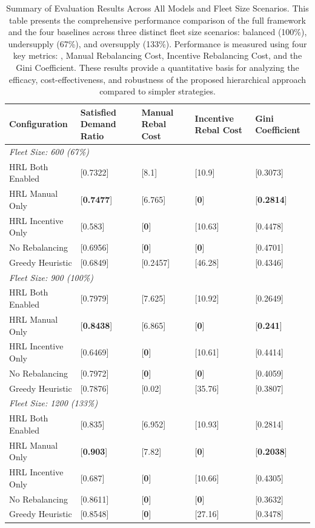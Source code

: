 \begin{table}
    \centering
    \begin{tabularx}{\textwidth}{lXXXX}
    \toprule
    \textbf{Configuration} & \textbf{Satisfied Demand Ratio} & \textbf{Manual Rebal Cost} & \textbf{Incentive Rebal Cost} & \textbf{Gini Coefficient} \\
    \midrule
    \multicolumn{5}{l}{\textit{Fleet Size: 600 (67\%)}} \\
    HRL Both Enabled & [0.7322] & [8.1] & [10.9] & [0.3073] \\
    HRL Manual Only & [\textbf{0.7477}] & [6.765] & [\textbf{0}] & [\textbf{0.2814}] \\
    HRL Incentive Only & [0.583] & [\textbf{0}] & [10.63] & [0.4478] \\
    No Rebalancing & [0.6956] & [\textbf{0}] & [\textbf{0}] & [0.4701] \\
    Greedy Heuristic & [0.6849] & [0.2457] & [46.28] & [0.4346] \\
    \midrule
    \multicolumn{5}{l}{\textit{Fleet Size: 900 (100\%)}} \\
    HRL Both Enabled & [0.7979] & [7.625] & [10.92] & [0.2649] \\
    HRL Manual Only & [\textbf{0.8438}] & [6.865] & [\textbf{0}] & [\textbf{0.241}] \\
    HRL Incentive Only & [0.6469] & [\textbf{0}] & [10.61] & [0.4414] \\
    No Rebalancing & [0.7972] & [\textbf{0}] & [\textbf{0}] & [0.4059] \\
    Greedy Heuristic & [0.7876] & [0.02] & [35.76] & [0.3807] \\
    \midrule
    \multicolumn{5}{l}{\textit{Fleet Size: 1200 (133\%)}} \\
    HRL Both Enabled & [0.835] & [6.952] & [10.93] & [0.2814] \\
    HRL Manual Only & [\textbf{0.903}] & [7.82] & [\textbf{0}] & [\textbf{0.2038}] \\
    HRL Incentive Only & [0.687] & [\textbf{0}] & [10.66] & [0.4305] \\
    No Rebalancing & [0.8611] & [\textbf{0}] & [\textbf{0}] & [0.3632] \\
    Greedy Heuristic & [0.8548] & [\textbf{0}] & [27.16] & [0.3478] \\
    \bottomrule
    \end{tabularx}
    \caption{Summary of Evaluation Results Across All Models and Fleet Size Scenarios. This table presents the comprehensive performance comparison of the full  framework and the four baselines across three distinct fleet size scenarios: balanced (100\%), undersupply (67\%), and oversupply (133\%). Performance is measured using four key metrics: , Manual Rebalancing Cost, Incentive Rebalancing Cost, and the Gini Coefficient. These results provide a quantitative basis for analyzing the efficacy, cost-effectiveness, and robustness of the proposed hierarchical approach compared to simpler strategies.}
    \label{tab:full_results_summary}
\end{table}


